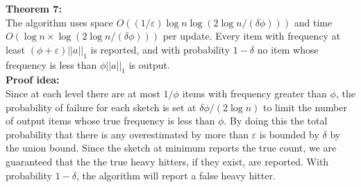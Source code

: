 \documentclass[11pt]{article}
\begin{document}
\textbf{Theorem 7:} \\
The algorithm uses space $O((1/\varepsilon)\log n \log (2 \log n/(\delta \phi)))$ and time $O(\log n \times \log(2 \log n/(\delta\phi)))$ per update. Every item with frequency at least $(\phi + \varepsilon)||a||_1$ is reported, and with probability $1-\delta$ no item whose frequency is less than $\phi ||a||_1$ is output.\\

\textbf{Proof idea:}\\
Since at each level there are at most $1/\phi$ items with frequency greater than $\phi$, the probability of failure for each sketch is set at $\delta\phi/(2\log n)$ to limit the number of output items whose true frequency is less than $\phi$. By doing this the total probability that there is any overestimated by more than $\varepsilon$ is bounded by $\delta$ by the union bound.
Since the sketch at minimum reports the true count, we are guaranteed that the the true heavy hitters, if they exist, are reported. With probability $1 - \delta$, the algorithm will report a false heavy hitter.


\end{document}
